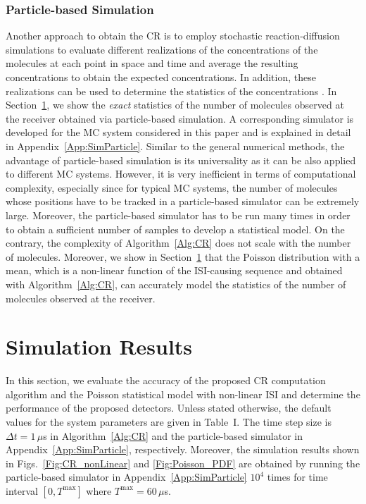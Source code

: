 \documentclass[conference]{IEEEtran}
\begin{document}
\subsubsection{Particle-based Simulation} Another approach to obtain the CR is to employ stochastic reaction-diffusion simulations to evaluate different realizations of the concentrations of the molecules at each point in space and time and average the resulting concentrations to obtain the expected concentrations. In addition, these realizations can be used to determine the statistics of the concentrations \cite{ReactionDiffSim,Chou_MasterEq,Adam_AcCoRD}. In Section~\ref{Sec:SimResult}, we show the \textit{exact} statistics of the number of molecules observed at the receiver obtained via particle-based simulation. A corresponding simulator is developed for the MC system considered in this paper and is explained in detail in Appendix~\ref{App:SimParticle}.  Similar to the general numerical methods, the advantage of particle-based simulation is its universality as it can be also applied to different MC systems. However, it is very inefficient in terms of computational complexity, especially since for typical MC systems, the number of molecules whose positions have to be tracked in a particle-based simulator can be extremely large. Moreover, the particle-based simulator has to be run many times in order to obtain a sufficient number of samples to develop a statistical model. On the contrary, the complexity of Algorithm~\ref{Alg:CR} does not scale with the number of molecules. Moreover, we show in Section~\ref{Sec:SimResult} that the Poisson distribution with a mean, which is a non-linear function of the ISI-causing sequence  and obtained with Algorithm~\ref{Alg:CR}, can accurately model the statistics of the number of molecules observed at the receiver.


\section{Simulation Results}\label{Sec:SimResult}


In this section, we evaluate the accuracy of the proposed CR computation algorithm and the Poisson statistical model with non-linear ISI and determine the performance of the proposed detectors. Unless stated otherwise, the default values for the system parameters are given in Table~I.  The time step size is  $\Delta t=1\,\mu$s in Algorithm~\ref{Alg:CR} and the particle-based simulator in Appendix~\ref{App:SimParticle}, respectively. Moreover, the simulation results shown in Figs.~\ref{Fig:CR_nonLinear} and \ref{Fig:Poisson_PDF} are obtained by  running the particle-based simulator in Appendix~\ref{App:SimParticle} $10^4$ times for time interval $[0,T^{\max}]$ where $T^{\max}=60\,\mu$s.
\end{document}
